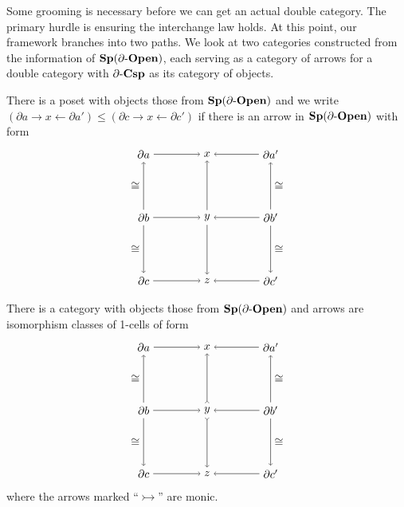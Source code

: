 \documentclass{amsart}
\begin{document}
Some grooming is necessary before we can get an actual double category.  The primary hurdle is ensuring the interchange law holds.  At this point, our framework branches into two paths.  We look at two categories constructed from the information of $ \mathbf{Sp}(\partial \text{-} \mathbf{Open}) $, each serving as a category of arrows for a double category with $ \partial \text{-} \mathbf{Csp} $ as its category of objects.

\begin{df} \label{df:ArrCatMonRwrt}
	There is a poset with objects those from $ \mathbf{Sp}(\partial \text{-} \mathbf{Open}) $ and we write $ (\partial a \to x \gets \partial a') \leq (\partial c \to x \gets \partial c') $ if there is an arrow in $ \mathbf{Sp}(\partial \text{-} \mathbf{Open}) $ with form
	\[
	\begin{tikzpicture}
		\node (a) at (-1,1) {$ \partial a $};
		\node (x) at (1,1) {$ x $};
		\node (a') at (3,1) {$ \partial a' $};
		\node (b) at (-1,-1) {$ \partial b $};
		\node (y) at (1,-1) {$ y $};
		\node (b') at (3,-1) {$ \partial b' $};
		\node (c) at (-1,-3) {$ \partial c $};
		\node (z) at (1,-3) {$ z $};
		\node (c') at (3,-3) {$ \partial c' $};
		\draw [->] (a) to (x);
		\draw [->] (a') to (x);
		\draw [->] (b) to (y);
		\draw [->] (b') to (y);
		\draw [->] (c) to (z);
		\draw [->] (c') to (z);
		\draw [->] (b) to node [left] {$ \cong $} (a);
		\draw [->] (b) to node [left] {$ \cong $} (c);
		\draw [->] (y) to (x);
		\draw [->] (y) to (z);
		\draw [->] (b') to node [right] {$ \cong $} (a');
		\draw [->] (b') to node [right] {$ \cong $} (c');
	\end{tikzpicture}
	\]
\end{df}

\begin{df} \label{df:ArrCatRwrt}
	There is a category with objects those from $ \mathbf{Sp}(\partial \text{-} \mathbf{Open}) $ and arrows are isomorphism classes of 1-cells of form
\[
\begin{tikzpicture}
	\node (a) at (-1,1) {$ \partial a $};
	\node (x) at (1,1) {$ x $};
	\node (a') at (3,1) {$ \partial a' $};
	\node (b) at (-1,-1) {$ \partial b $};
	\node (y) at (1,-1) {$ y $};
	\node (b') at (3,-1) {$ \partial b' $};
	\node (c) at (-1,-3) {$ \partial c $};
	\node (z) at (1,-3) {$ z $};
	\node (c') at (3,-3) {$ \partial c' $};
	\draw [->] (a) to (x);
	\draw [->] (a') to (x);
	\draw [->] (b) to (y);
	\draw [->] (b') to (y);
	\draw [->] (c) to (z);
	\draw [->] (c') to (z);
	\draw [->] (b) to node [left] {$ \cong $} (a);
	\draw [->] (b) to node [left] {$ \cong $} (c);
	\draw [>->] (y) to (x);
	\draw [>->] (y) to (z);
	\draw [->] (b') to node [right] {$ \cong $} (a');
	\draw [->] (b') to node [right] {$ \cong $} (c');
\end{tikzpicture}
\]
where the arrows marked ``$ \rightarrowtail $'' are monic. 
\end{df}
\end{document}
